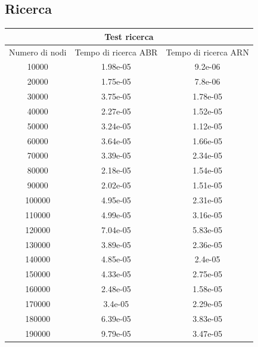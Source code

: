 \documentclass{article}
\begin{document}
\subsection{Ricerca}
{\centering}
{\renewcommand{\arraystretch}{0.9}}
\begin{longtable}{c|c|c}
\hline
\multicolumn{3}{c}{Test ricerca}\\
\hline
   Numero di nodi &   Tempo di ricerca ABR &   Tempo di ricerca ARN \\
\hline
            10000 &               1.98e-05 &               9.2e-06  \\
            20000 &               1.75e-05 &               7.8e-06  \\
            30000 &               3.75e-05 &               1.78e-05 \\
            40000 &               2.27e-05 &               1.52e-05 \\
            50000 &               3.24e-05 &               1.12e-05 \\
            60000 &               3.64e-05 &               1.66e-05 \\
            70000 &               3.39e-05 &               2.34e-05 \\
            80000 &               2.18e-05 &               1.54e-05 \\
            90000 &               2.02e-05 &               1.51e-05 \\
           100000 &               4.95e-05 &               2.31e-05 \\
           110000 &               4.99e-05 &               3.16e-05 \\
           120000 &               7.04e-05 &               5.83e-05 \\
           130000 &               3.89e-05 &               2.36e-05 \\
           140000 &               4.85e-05 &               2.4e-05  \\
           150000 &               4.33e-05 &               2.75e-05 \\
           160000 &               2.48e-05 &               1.58e-05 \\
           170000 &               3.4e-05  &               2.29e-05 \\
           180000 &               6.39e-05 &               3.83e-05 \\
           190000 &               9.79e-05 &               3.47e-05 \\

\end{longtable}
\end{document}
